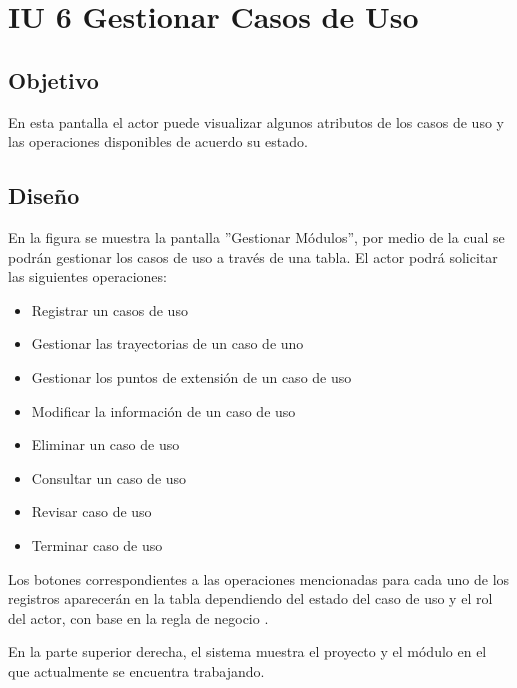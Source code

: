 \section{IU 6 Gestionar Casos de Uso}

\subsection{Objetivo}
	En esta pantalla el actor puede visualizar algunos atributos de los casos de uso y las operaciones disponibles de acuerdo su estado.
\subsection{Diseño}
	En la figura  se muestra la pantalla ''Gestionar Módulos'', por medio de la cual se podrán gestionar los casos de uso a través de una tabla. El actor podrá solicitar las siguientes operaciones:
	\begin{itemize}
		\item Registrar un casos de uso
		\item Gestionar las trayectorias de un caso de uno
		\item Gestionar los puntos de extensión de un caso de uso
		\item Modificar la información de un caso de uso
		\item Eliminar un caso de uso
		\item Consultar un caso de uso
		\item Revisar caso de uso
		\item Terminar caso de uso
	\end{itemize}

Los botones correspondientes a las operaciones mencionadas para cada uno de los registros aparecerán en la tabla dependiendo del estado del caso de uso y el rol del actor, con base en la regla de negocio .

En la parte superior derecha, el sistema muestra el proyecto y el módulo en el que actualmente se encuentra trabajando.
